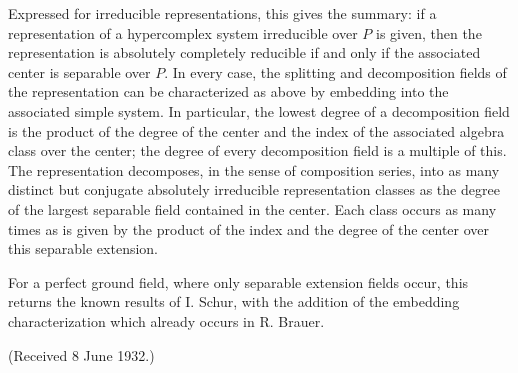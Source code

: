 \documentclass[11pt]{article}
\begin{document}
Expressed for irreducible representations, this gives the summary: if a representation of a hypercomplex system irreducible over \(P\) is given, then the representation is absolutely completely reducible if and only if the associated center is separable over \(P\). In every case, the splitting and decomposition fields of the representation can be characterized as above by embedding into the associated simple system. In particular, the lowest degree of a decomposition field is the product of the degree of the center and the index of the associated algebra class over the center; the degree of every decomposition field is a multiple of this. The representation decomposes, in the sense of composition series, into as many distinct but conjugate absolutely irreducible representation classes as the degree of the largest separable field contained in the center. Each class occurs as many times as is given by the product of the index and the degree of the center over this separable extension.

For a perfect ground field, where only separable extension fields occur, this returns the known results of I. Schur, with the addition of the embedding characterization which already occurs in R. Brauer.

\begin{center}
(Received 8 June 1932.)
\end{center}
\end{document}

